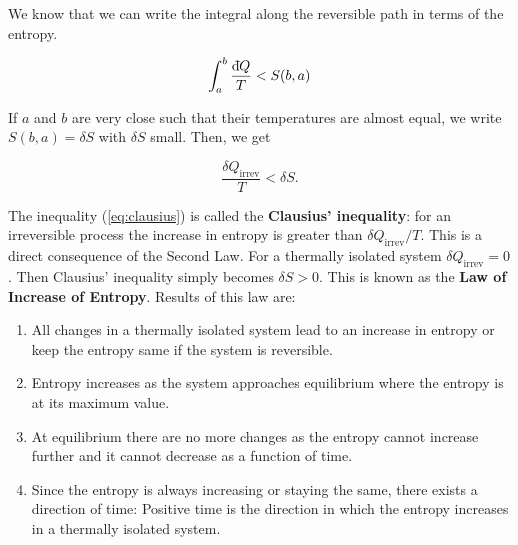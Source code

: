        We know that we can write the integral along the reversible path in terms of the entropy. 
        
        \begin{equation}
            \int_a^b\frac{\text{d}\hspace*{-0.13em}\bar{}\hspace*{0.1em} Q}{T} < S(b,a)
        \end{equation}
        
        If $a$ and $b$ are very close such that their temperatures are almost equal, we write $S(b,a) = \delta S$ with $\delta S$ small. Then, we get
        
        \begin{equation}
            \frac{\delta Q_\text{irrev}}{T} < \delta S.
            \label{eq:clausius}
        \end{equation}
        
        The inequality (\ref{eq:clausius}) is called the \textbf{Clausius' inequality}: for an irreversible process the increase in entropy is greater than $\delta Q_\text{irrev}/T$. This is a direct consequence of the Second Law. For a thermally isolated system $\delta Q_\text{irrev} = 0$. Then Clausius' inequality simply becomes $\delta S > 0$. This is known as the \textbf{Law of Increase of Entropy}. Results of this law are:
        \begin{enumerate}
            \item All changes in a thermally isolated system lead to an increase in entropy or keep the entropy same if the system is reversible.
            \item Entropy increases as the system approaches equilibrium where the entropy is at its maximum value. 
            \item At equilibrium there are no more changes as the entropy cannot increase further and it cannot decrease as a function of time. 
            \item Since the entropy is always increasing or staying the same, there exists a direction of time: Positive time is the direction in which the entropy increases in a thermally isolated system.
        \end{enumerate}

